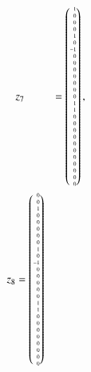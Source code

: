 \begin{beispiel}
{\begin{align*}
&z_7 %
&=
\tiny
\begin{pmatrix*}[r]
 1\\
 0\\
 0\\
 0\\
 1\\
 0\\
-1\\
 0\\
 0\\
 0\\
 0\\
 0\\
 0\\
 0\\
 1\\
 1\\
 0\\
 0\\
 0\\
 0\\
 0\\
 0\\
 0\\
 0\\
 0\\
 0\\
 0
\end{pmatrix*},\\
z_8 %
&=
\tiny
\begin{pmatrix*}[r]
 0\\
 0\\
 1\\
 0\\
 0\\
 0\\
 0\\
 0\\
 1\\
 0\\
-1\\
 0\\
 0\\
 0\\
 0\\
 0\\
 1\\
 1\\
 0\\
 0\\
 0\\
 0\\
 0\\
 0\\
 0\\
 0\\

\end{pmatrix*}
\end{align*}}
\end{beispiel}
